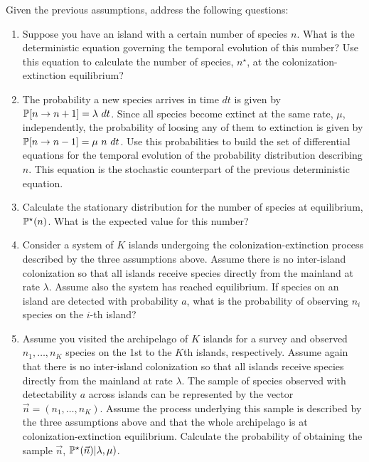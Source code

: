 Given the previous assumptions, address the following questions:
\begin{enumerate}
\item Suppose you have an island with a certain number of species $n$. What is the deterministic equation governing the temporal evolution of this number? Use this equation to calculate the number of species, $n^{\star}$, at the colonization-extinction equilibrium? 

\item The probability a new species arrives in time $dt$ is given by $\Pb[n \rightarrow n+1] = \lambda\ dt$. Since all species become extinct at the same rate, $\mu$, independently, the probability of loosing any of them to extinction is given by $\Pb[n \rightarrow n -1] = \mu\ n\ dt$. Use this probabilities to build the set of differential equations for the temporal evolution of the probability distribution describing $n$. This equation is the stochastic counterpart of the previous deterministic equation. 

\item Calculate the stationary distribution for the number of species at equilibrium, ${\mathbb P}^{\star}(n)$. What is the expected value for this number?

\item Consider a system of $K$ islands undergoing the colonization-extinction process described by the three assumptions above.  Assume there is no inter-island colonization so that all islands receive species directly from the mainland at rate $\lambda$. Assume also the system has reached equilibrium. If species on an island are detected with probability $a$, what is the probability of observing $n_i$ species on the $i$-th island? 

\item Assume you visited the archipelago of $K$ islands for a survey and observed $n_1, \dots, n_K$ species on the 1st to the $K$th islands, respectively. Assume again that there is no inter-island colonization so that all islands receive species directly from the mainland at rate $\lambda$. The sample of species observed with detectability $a$ across islands can be represented by the vector $\vec{n} = (n_1, \dots, n_K)$. Assume the process underlying this sample is described by the three assumptions above and that the whole archipelago is at colonization-extinction equilibrium. Calculate the probability of obtaining the sample $\vec{n}$, ${\mathbb P}^{\star}(\vec{n}) | \lambda, \mu)$. 


\end{enumerate}
